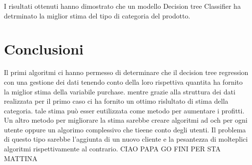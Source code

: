 \documentclass{article}
\begin{document}
I risultati ottenuti hanno dimostrato che un modello Decision tree Classifier ha detrminato la miglior stima del tipo di categoria del prodotto.

\section{Conclusioni}
Il primi algoritmi ci hanno permesso di determinare che il decision tree regression con una gestione dei dati tenendo conto della loro rispettiva quantita ha fornito la miglior stima della variabile purchase.
mentre grazie alla struttura dei dati realizzata per il primo caso ci ha fornito un ottimo rislultato di stima della categoria. tale stima può esser eutilizzata come metodo per aumentare i profitti.
Un altro metodo per migliorare la stima sarebbe creare algoritmi ad och per ogni utente oppure un algorimo complessivo che tieene conto degli utenti. Il problema di questo tipo sarebbe l'aggiunta di un nuovo cliente e la pesantezza di molteplici algoritmi rispettivamente al contrario.
CIAO PAPA
GO FINI PER STA MATTINA

\nocite{*}
\printbibliography[title=Bibliografia]{}
\end{document}
